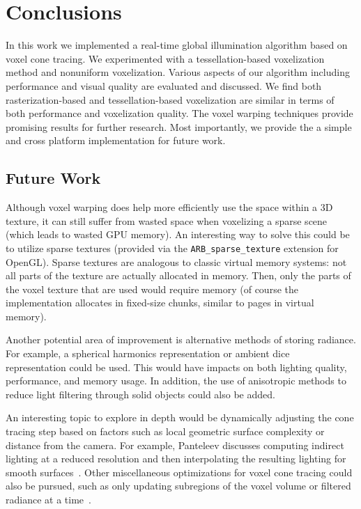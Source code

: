 \chapter{Conclusions}

In this work we implemented a real-time global illumination algorithm based on voxel cone tracing. We experimented with a tessellation-based voxelization method and nonuniform voxelization. Various aspects of our algorithm including performance and visual quality are evaluated and discussed. We find both rasterization-based and tessellation-based voxelization are similar in terms of both performance and voxelization quality. The voxel warping techniques provide promising results for further research. Most importantly, we provide the a simple and cross platform implementation for future work.

\section{Future Work}
Although voxel warping does help more efficiently use the space within a 3D texture, it can still suffer from wasted space when voxelizing a sparse scene (which leads to wasted GPU memory). An interesting way to solve this could be to utilize sparse textures (provided via the \verb#ARB_sparse_texture# extension for OpenGL). Sparse textures are analogous to classic virtual memory systems: not all parts of the texture are actually allocated in memory. Then, only the parts of the voxel texture that are used would require memory (of course the implementation allocates in fixed-size chunks, similar to pages in virtual memory).

Another potential area of improvement is alternative methods of storing radiance. For example, a spherical harmonics representation or ambient dice~\cite{iwanicki2017ambient} representation could be used. This would have impacts on both lighting quality, performance, and memory usage. In addition, the use of anisotropic methods to reduce light filtering through solid objects could also be added.

An interesting topic to explore in depth would be dynamically adjusting the cone tracing step based on factors such as local geometric surface complexity or distance from the camera. For example, Panteleev discusses computing indirect lighting at a reduced resolution and then interpolating the resulting lighting for smooth surfaces~\cite{practicalvxgi}. Other miscellaneous optimizations for voxel cone tracing could also be pursued, such as only updating subregions of the voxel volume or filtered radiance at a time~\cite{mclaren2016cascaded}.



